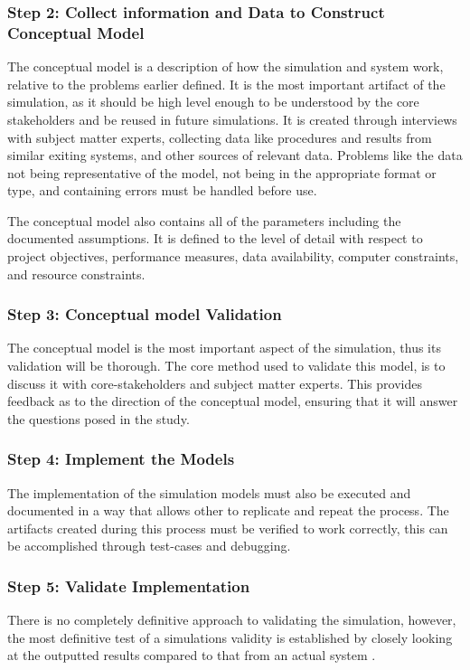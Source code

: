 \subsubsection{Step 2: Collect information and Data to Construct Conceptual Model}
The conceptual model is a description of how the simulation and system work, relative to the problems earlier defined.
It is the most important artifact of the simulation, as it should be high level enough to be understood by the core stakeholders
and be reused in future simulations.
It is created through interviews with subject matter experts, collecting data like procedures and results from similar exiting systems, and other sources of relevant data.
Problems like the data not being representative of the model, not being in the appropriate format or type, and containing errors must be handled before use.

The conceptual model also contains all of the parameters including the documented assumptions. 
It is defined to the level of detail with respect to project objectives, performance measures, data availability, computer constraints, and resource constraints.

\subsubsection{Step 3: Conceptual model Validation}
The conceptual model is the most important aspect of the simulation, thus its validation will be thorough.
The core method used to validate this model, is to discuss it with core-stakeholders and subject matter experts.
This provides feedback as to the direction of the conceptual model, ensuring that it will answer the questions posed in the study.

\subsubsection{Step 4: Implement the Models}
The implementation of the simulation models must also be executed and documented in a way that allows other to replicate and repeat the process.
The artifacts created during this process must be verified to work correctly, this can be accomplished through test-cases and debugging.

\subsubsection{Step 5: Validate Implementation}
There is no completely definitive approach to validating the simulation,
however, the most definitive test of a simulations validity is established by closely looking at the outputted results compared to that from an actual system \cite{Law2005}.

